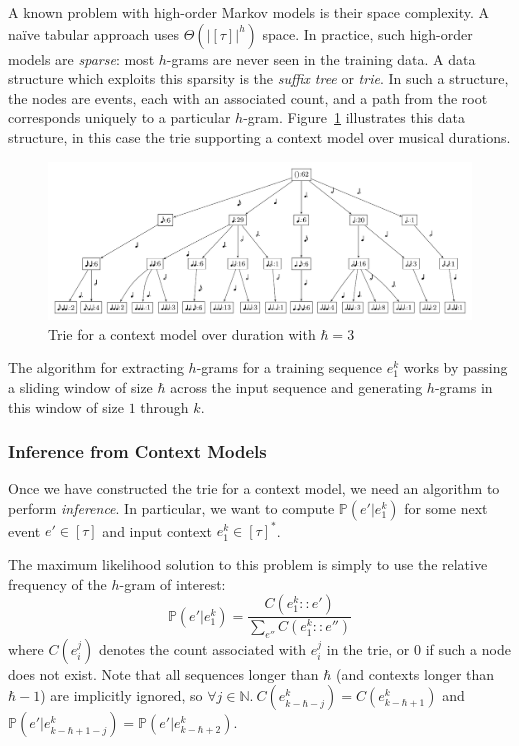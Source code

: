 \documentclass[12pt,a4paper,twoside,openright]{report}
\begin{document}
A known problem with high-order Markov models is their space complexity. A naïve
tabular approach uses $\Theta(|[\tau]|^h)$ space.  In practice, such high-order
models are \emph{sparse}: most $h$-grams are never seen in the training data. A
data structure which exploits this sparsity is the \emph{suffix tree} or
\emph{trie}.  In such a structure, the nodes are events, each with an associated
count, and a path from the root corresponds uniquely to a particular $h$-gram.
Figure~\ref{fig:dur-trie} illustrates this data structure, in this case the trie
supporting a context model over musical durations. 

\begin{figure}[H]
\centering
\includegraphics[width=455pt]{figs/duration_vp.pdf}
\caption{Trie for a context model over duration with $\hbar = 3$}
\label{fig:dur-trie}
\end{figure}

The algorithm for extracting $h$-grams for a training sequence $e_1^k$ works by
passing a sliding window of size $\hbar$ across the input sequence and
generating $h$-grams in this window of size $1$ through $k$. 

\subsubsection{Inference from Context Models}

Once we have constructed the trie for a context model, we need an algorithm to
perform \emph{inference}. In particular, we want to compute $\mathbb{P}(e' |
e_1^k)$ for some next event $e' \in [\tau]$ and input context $e_1^k \in
[\tau]^*$.

The maximum likelihood solution to this problem is simply to use the relative
frequency of the $h$-gram of interest:
\begin{equation}
  \mathbb{P}(e'|e_1^k) = \frac{ C(e_1^k::e') }{ \sum_{e''} C(e_1^k::e'') }
  \label{eq:ctx-max-like}
\end{equation}
where $C(e_i^j)$ denotes the count associated with $e_i^j$ in the trie, or $0$
if such a node does not exist. Note that all sequences longer than $\hbar$ (and
contexts longer than $\hbar-1$) are implicitly ignored, so $\forall j \in
\mathbb{N}.\ C(e_{k-\hbar-j}^k) = C(e_{k-\hbar+1}^k)$ and
$\mathbb{P}(e'|e_{k-\hbar+1-j}^k) = \mathbb{P}(e'|e_{k-\hbar+2}^k)$.
\end{document}
